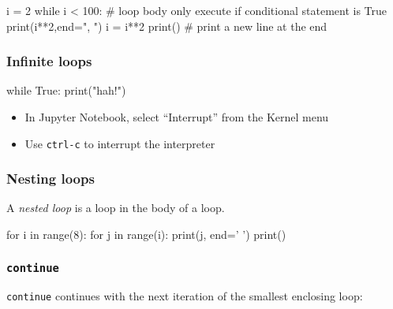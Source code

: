 \documentclass[12pt]{article} \newif\ifsolution\solutiontrue %
\begin{document}
\begin{python}
i = 2 while i < 100:     # loop body only execute if conditional statement is True     print(i**2,end=", ")     i = i**2 print() # print a new line at the end
\end{python}

\subsubsection{Infinite loops}\label{infinite-loops}

\begin{python}
while True:     print("hah!")
\end{python}

\begin{itemize}
\item
  In Jupyter Notebook, select ``Interrupt'' from the Kernel menu
\item
  Use \texttt{ctrl-c} to interrupt the interpreter
\end{itemize}

\subsubsection{Nesting loops}\label{nesting-loops}

A \emph{nested loop} is a loop in the body of a loop.

\begin{python}
for i in range(8):     for j in range(i):         print(j, end=' ')     print()
\end{python}

\subsubsection{\texorpdfstring{\texttt{continue}}{continue}}\label{continue}

\texttt{continue} continues with the next iteration of the smallest
enclosing loop:

\end{document}
